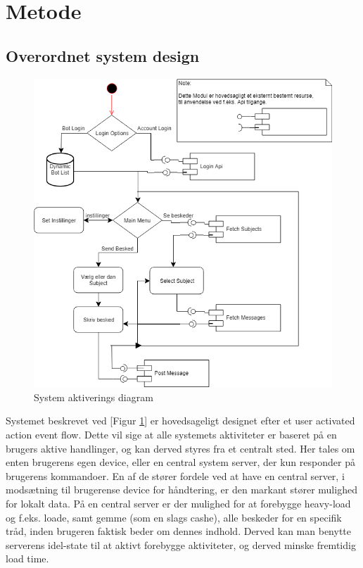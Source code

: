 \section{Metode}
\subsection{Overordnet system design}
\begin{figure}[H]
    \centering
    \includegraphics[width=0.85\linewidth]{Projectdoc/Assets/Illustrationer/system-diagram.png}
    \caption{System aktiverings diagram}
    \label{fig:sysdiagram}
\end{figure}

Systemet beskrevet ved [Figur \ref{fig:sysdiagram}] er hovedsageligt designet efter et user activated action event flow. 
Dette vil sige at alle systemets aktiviteter er baseret på en brugers aktive handlinger, og kan derved styres fra et centralt sted. Her tales om enten brugerens egen device, eller en central system server, der kun responder på brugerens kommandoer.
En af de stører fordele ved at have en central server, i modsætning til brugerense device for håndtering, er den markant stører mulighed for lokalt data. På en central server er der mulighed for at forebygge heavy-load og f.eks. loade, samt gemme (som en slags cashe), alle beskeder for en specifik tråd, inden brugeren faktisk beder om dennes indhold. Derved kan man benytte serverens idel-state til at aktivt forebygge aktiviteter, og derved minske fremtidig load time.



